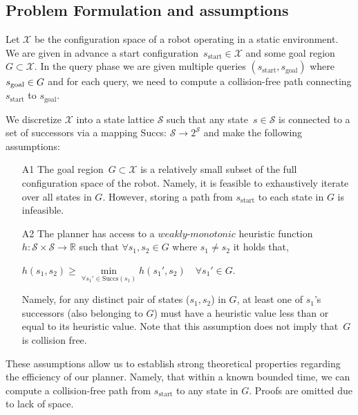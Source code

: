 \documentclass[letterpaper, 10 pt, conference]{ieeeconf}  %
\newcommand{\calX}{\ensuremath{\mathcal{X}}\xspace}
\newcommand{\calS}{\ensuremath{\mathcal{S}}\xspace}
\newcommand{\sStart}{\ensuremath{s_{\text{start}}\xspace}}
\begin{document}
\subsection{Problem Formulation and assumptions}
Let $\calX$ be the configuration space of a robot operating in a static environment.
We are given in advance a start configuration~$\sStart \in \calX$ and some goal region~$G \subset \calX$.
In the query phase we are given multiple queries $(\sStart, s_{\text{goal}})$ where $s_{\rm goal} \in G$ and for each query, we need to compute a collision-free path connecting $\sStart$ to $s_{\text{goal}}$.

We discretize $\calX$ into a state lattice $\calS$ such that any state~$s \in \calS$ is connected to a set of successors via a mapping Succs: $\calS \rightarrow 2^\calS$ and make the following assumptions:

\begin{enumerate}
  \item[A1] The goal region~$G \subset \calX$ is a relatively small subset of the full configuration space of the robot. Namely, it is feasible to exhaustively iterate over all states in $G$.
However, storing a path from $\sStart$ to each state in $G$ is infeasible.
  
  \item[A2] The planner has access to a $\textit{weakly-monotonic}$ heuristic function $h: \calS \times \calS \rightarrow \mathbb{R}$ such that $\forall s_1, s_2  \in G$ where $s_1 \neq s_2$ it holds that,

  \begin{center}
    $h(s_1, s_2) \geq \min\limits_{\forall s_1' \in \text{Succs}(s_1)} h(s_1', s_2) \quad \forall s_1'\in G $. 
  \end{center}
  Namely, for any distinct pair of states ($s_1, s_2$) in $G$, at least one of $s_1$'s successors (also belonging to $G$) must have a heuristic value less than or equal to its heuristic value. 
	Note that this assumption does not imply  that~$G$ is collision free.
%	
%	
\end{enumerate}

These assumptions allow us to establish strong theoretical properties regarding the efficiency of our planner. Namely, that
within a known bounded time, we can compute a collision-free path from $\sStart$ to any state in $G$. Proofs are omitted due to lack of space. 
\end{document}
